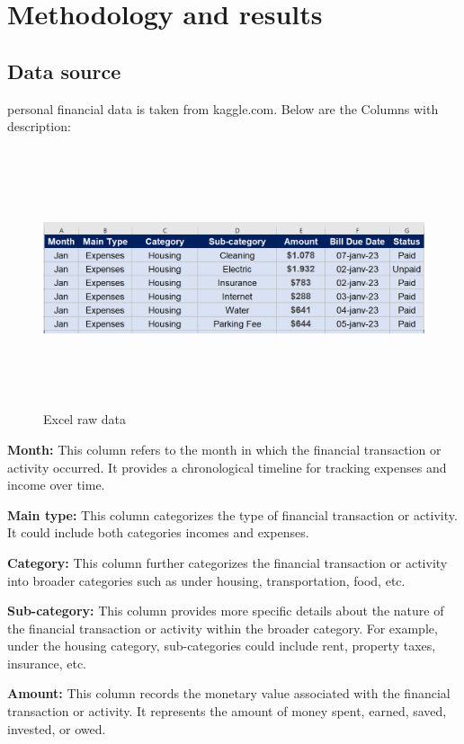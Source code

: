 \chapter{Methodology and results }
\label{ch2}


\section{Data source}
personal financial data is taken from kaggle.com. Below are the Columns with description:

\begin{figure}[h]
    \centering
    \includegraphics[width=6.0in, height=3.0in]{Figure/Capture d’écran (504).png}
    \caption{Excel raw data}
    \label{fig:enter-label}
\end{figure}

\textbf{Month:} This column refers to the month in which the financial transaction or activity occurred. It provides a chronological timeline for tracking expenses and income over time.

\textbf{Main type:} This column categorizes the type of financial transaction or activity. It could include both categories incomes and expenses.

\textbf{Category:} This column further categorizes the financial transaction or activity into broader categories such as  under  housing, transportation, food, etc.

\textbf{Sub-category: }This column provides more specific details about the nature of the financial transaction or activity within the broader category. For example, under the housing category, sub-categories could include rent, property taxes, insurance, etc.

\textbf{Amount:} This column records the monetary value associated with the financial transaction or activity. It represents the amount of money spent, earned, saved, invested, or owed.

